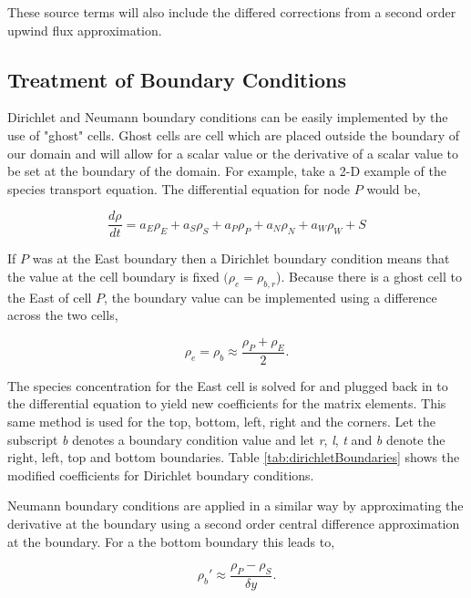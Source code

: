 \noindent These source terms will also include the differed corrections from a second order upwind flux approximation. 


\subsection{Treatment of Boundary Conditions}
Dirichlet and Neumann boundary conditions can be easily implemented by the use of "ghost" cells. Ghost cells are cell which are placed outside the boundary of our domain and will allow for a scalar value or the derivative of a scalar value to be set at the boundary of the domain. For example, take a 2-D example of the species transport equation. The differential equation for node $P$ would be,

\begin{equation}
    \frac{d\rho}{dt} = a_{E}\rho_{E} + a_{S}\rho_{S} + a_{P}\rho_{P} + a_{N}\rho_{N} + a_{W}\rho_{W} + S
\end{equation}

\noindent If $P$ was at the East boundary then a Dirichlet boundary condition means that the value at the cell boundary is fixed $(\rho_{e} = \rho_{b,r}$). Because there is a ghost cell to the East of cell $P$, the boundary value can be implemented using a difference across the two cells,

\begin{equation}
    \rho_{e} = \rho_{b} \approx \frac{\rho_{P} + \rho_{E}}{2}.
\end{equation}

\noindent The species concentration for the East cell is solved for and plugged back in to the differential equation to yield new coefficients for the matrix elements. This same method is used for the top, bottom, left, right and the corners. Let the subscript \textit{b} denotes a boundary condition value and let \textit{r}, \textit{l}, \textit{t} and \textit{b} denote the right, left, top and bottom boundaries. Table \ref{tab:dirichletBoundaries} shows the modified coefficients for Dirichlet boundary conditions. 

Neumann boundary conditions are applied in a similar way by approximating the derivative at the boundary using a second order central difference approximation at the boundary. For a the bottom boundary this leads to,

\begin{equation}
    \rho_{b}' \approx \frac{\rho_{P} - \rho_{S}}{\delta y}.
\end{equation}

